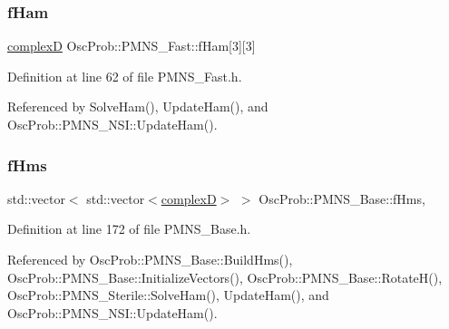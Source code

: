 \mbox{\label{classOscProb_1_1PMNS__Fast_a94286a881bc53dd512a89d548346b611}} 
\subsubsection{\texorpdfstring{f\+Ham}{fHam}}
{\footnotesize\ttfamily \hyperlink{EigenPoint_8h_a67ca8e107e20610c3fff78d5e726ece0}{complexD} Osc\+Prob\+::\+P\+M\+N\+S\+\_\+\+Fast\+::f\+Ham\mbox{[}3\mbox{]}\mbox{[}3\mbox{]}\hspace{0.3cm}{\ttfamily [protected]}}



Definition at line 62 of file P\+M\+N\+S\+\_\+\+Fast.\+h.



Referenced by Solve\+Ham(), Update\+Ham(), and Osc\+Prob\+::\+P\+M\+N\+S\+\_\+\+N\+S\+I\+::\+Update\+Ham().

\mbox{\label{classOscProb_1_1PMNS__Base_acd3c8783e7603081eab316ea4c86c766}} 
\subsubsection{\texorpdfstring{f\+Hms}{fHms}}
{\footnotesize\ttfamily std\+::vector$<$ std\+::vector$<$\hyperlink{EigenPoint_8h_a67ca8e107e20610c3fff78d5e726ece0}{complexD}$>$ $>$ Osc\+Prob\+::\+P\+M\+N\+S\+\_\+\+Base\+::f\+Hms\hspace{0.3cm}{\ttfamily [protected]}, {\ttfamily [inherited]}}



Definition at line 172 of file P\+M\+N\+S\+\_\+\+Base.\+h.



Referenced by Osc\+Prob\+::\+P\+M\+N\+S\+\_\+\+Base\+::\+Build\+Hms(), Osc\+Prob\+::\+P\+M\+N\+S\+\_\+\+Base\+::\+Initialize\+Vectors(), Osc\+Prob\+::\+P\+M\+N\+S\+\_\+\+Base\+::\+Rotate\+H(), Osc\+Prob\+::\+P\+M\+N\+S\+\_\+\+Sterile\+::\+Solve\+Ham(), Update\+Ham(), and Osc\+Prob\+::\+P\+M\+N\+S\+\_\+\+N\+S\+I\+::\+Update\+Ham().


